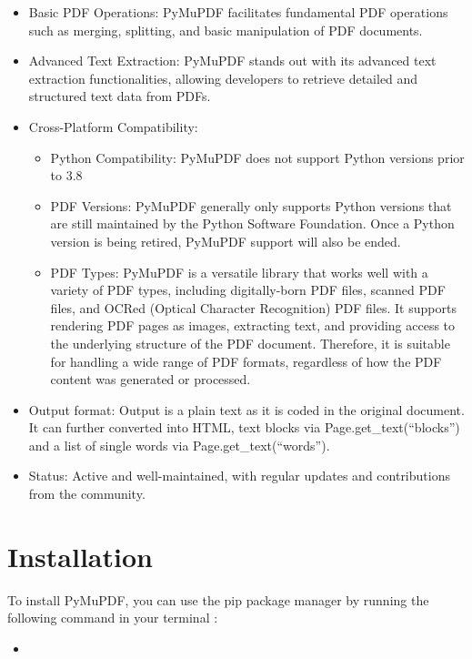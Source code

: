 \begin{itemize}
    \item Basic PDF Operations: PyMuPDF facilitates fundamental PDF operations such as merging, splitting, and basic manipulation of PDF documents.
    \item Advanced Text Extraction: PyMuPDF stands out with its advanced text extraction functionalities, allowing developers to retrieve detailed and structured text data from PDFs.
        \item Cross-Platform Compatibility: 
   	 \begin{itemize}
    \item Python Compatibility: PyMuPDF does not support Python versions prior to 3.8
    \item PDF Versions: PyMuPDF generally only supports Python versions that are still maintained by the Python Software Foundation. Once a Python version is being retired, PyMuPDF support will also be ended. 
    \item PDF Types: PyMuPDF is a versatile library that works well with a variety of PDF types, including digitally-born PDF files, scanned PDF files, and OCRed (Optical Character Recognition) PDF files. It supports rendering PDF pages as images, extracting text, and providing access to the underlying structure of the PDF document. Therefore, it is suitable for handling a wide range of PDF formats, regardless of how the PDF content was generated or processed.
	 \end{itemize}
    \item Output format: Output is a plain text as it is coded in the original document. It can further converted into HTML, text blocks via Page.get\_text(“blocks”) and a list of single words via Page.get\_text(“words”). 
    \item Status: Active and well-maintained, with regular updates and contributions from the community.
\end{itemize}

\section{Installation}

To install PyMuPDF, you can use the pip package manager by running the following command in your terminal \cite{pymupdf:2024c}:%

\begin{itemize}
    \item[] 
\end{itemize}

